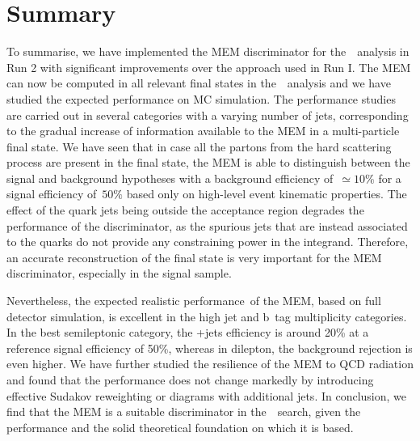 \section{Summary}
To summarise, we have implemented the MEM discriminator for the~\ttHbb~analysis in Run 2 with significant improvements over the approach used in Run I. The MEM can now be computed in all relevant final states in the~\ttHbb~analysis and we have studied the expected performance on MC simulation. The performance studies are carried out in several categories with a varying number of jets, corresponding to the gradual increase of information available to the MEM in a multi-particle final state. We have seen that in case all the partons from the hard scattering process are present in the final state, the MEM is able to distinguish between the signal and background hypotheses with a background efficiency of~$\simeq 10\%$ for a signal efficiency of~$50\%$ based only on high-level event kinematic properties. The effect of the quark jets being outside the acceptance region degrades the performance of the discriminator, as the spurious jets that are instead associated to the quarks do not provide any constraining power in the integrand. Therefore, an accurate reconstruction of the final state is very important for the MEM discriminator, especially in the signal sample.

Nevertheless, the expected realistic performance of the MEM, based on full detector simulation, is excellent in the high jet and b~tag multiplicity categories. In the best semileptonic category, the \ttbar+jets efficiency is around 20\% at a reference signal efficiency of 50\%, whereas in dilepton, the background rejection is even higher. We have further studied the resilience of the MEM to QCD radiation and found that the performance does not change markedly by introducing effective Sudakov reweighting or diagrams with additional jets. In conclusion, we find that the MEM is a suitable discriminator in the~\ttHbb~search, given the performance and the solid theoretical foundation on which it is based.
